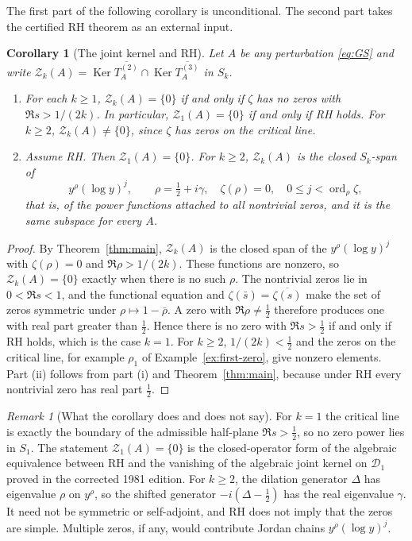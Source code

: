 \documentclass[12pt,letterpaper]{article}
\newtheorem{corollary}[theorem]{Corollary}
\theoremstyle{remark}
\newtheorem{remark}[theorem]{Remark}
\numberwithin{equation}{section}
\newcommand{\Ker}{\operatorname{Ker}}
\begin{document}
The first part of the following corollary is unconditional.  The second
part takes the certified RH theorem \cite{LF26,Ru26} as an external input.

\begin{corollary}[The joint kernel and RH]\label{cor:rh-kernel}
Let $A$ be any perturbation \eqref{eq:GS} and write
$\mathcal Z_k(A)=\Ker\overline{T_A^{(2)}}\cap\Ker\overline{T_A^{(3)}}$
in $S_k$.
\begin{enumerate}[label=(\roman*)]
\item For each $k\ge1$, $\mathcal Z_k(A)=\{0\}$ if and only if $\zeta$ has
no zeros with $\Re s>1/(2k)$.  In particular,
$\mathcal Z_1(A)=\{0\}$ if and only if RH holds.  For $k\ge2$,
$\mathcal Z_k(A)\ne\{0\}$, since $\zeta$ has zeros on the critical line.
\item Assume RH.  Then $\mathcal Z_1(A)=\{0\}$.  For $k\ge2$,
$\mathcal Z_k(A)$ is the closed $S_k$-span of
\[
 y^{\rho}(\log y)^j,\qquad \rho=\tfrac12+i\gamma,\quad\zeta(\rho)=0,
 \quad 0\le j<\operatorname{ord}_\rho\zeta,
\]
that is, of the power functions attached to \emph{all} nontrivial zeros,
and it is the same subspace for every $A$.
\end{enumerate}
\end{corollary}

\begin{proof}
By Theorem~\ref{thm:main}, $\mathcal Z_k(A)$ is the closed span of the
$y^\rho(\log y)^j$ with $\zeta(\rho)=0$ and $\Re\rho>1/(2k)$.  These
functions are nonzero, so $\mathcal Z_k(A)=\{0\}$ exactly when there is
no such $\rho$.  The nontrivial zeros lie in $0<\Re s<1$, and the
functional equation and $\zeta(\bar s)=\overline{\zeta(s)}$ make the
set of zeros symmetric under $\rho\mapsto1-\bar\rho$.  A zero with
$\Re\rho\ne\frac12$ therefore produces one with real part greater than
$\frac12$.  Hence there is no zero with $\Re s>\frac12$ if and only if
RH holds, which is the case $k=1$.  For $k\ge2$, $1/(2k)<\frac12$ and the
zeros on the critical line, for example $\rho_1$ of
Example~\ref{ex:first-zero}, give nonzero elements.  Part (ii) follows
from part (i) and Theorem~\ref{thm:main}, because under RH every
nontrivial zero has real part $\frac12$.
\end{proof}

\begin{remark}[What the corollary does and does not say]
For $k=1$ the critical line is exactly the boundary of the admissible
half-plane $\Re s>\frac12$, so no zero power lies in $S_1$.  The
statement $\mathcal Z_1(A)=\{0\}$ is the closed-operator form of the
algebraic equivalence between RH and the vanishing of the algebraic
joint kernel on $\mathcal D_1$ proved in the corrected 1981 edition.
For $k\ge2$, the dilation generator $\Delta$ has eigenvalue $\rho$ on
$y^\rho$, so the shifted generator $-i(\Delta-\frac12)$ has the real
eigenvalue $\gamma$.  It need not be symmetric or self-adjoint, and RH
does not imply that the zeros are simple.  Multiple zeros, if any,
would contribute Jordan chains $y^\rho(\log y)^j$.
\end{remark}
\end{document}
